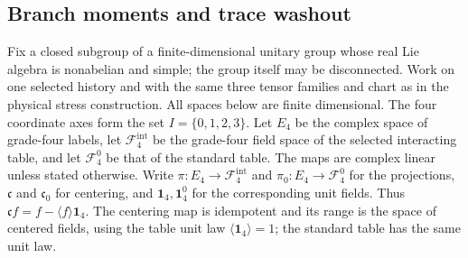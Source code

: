 \subsection{Branch moments and trace washout}
\label{sec:ex-trace-branch-moments}

Fix a closed subgroup of a finite-dimensional unitary group whose real Lie
algebra is nonabelian and simple; the group itself may be disconnected.
Work on one selected history and with the same three tensor families and
chart as in the physical stress construction.
All spaces below are finite dimensional. The four coordinate axes form the
set $I=\{0,1,2,3\}$.
Let $E_4$ be the complex space of grade-four labels, let $\mathcal F_4^{\mathrm{int}}$
be the grade-four field space of the selected interacting table, and let
$\mathcal F_4^0$ be that of the standard table. The maps are complex linear
unless stated otherwise. Write $\pi:E_4\to\mathcal F_4^{\mathrm{int}}$ and
$\pi_0:E_4\to\mathcal F_4^0$ for the projections, $\mathfrak c$ and
$\mathfrak c_0$ for centering, and $\mathbf 1_4,\mathbf1_4^0$ for the
corresponding unit fields. Thus
$\mathfrak c f=f-\langle f\rangle\mathbf1_4$. The centering map is
idempotent and its range is the space of centered fields, using the table
unit law $\langle\mathbf1_4\rangle=1$; the standard table has the same
unit law.

